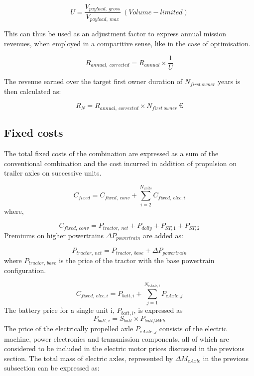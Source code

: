 \documentclass[ExampleMasters.tex]{subfiles}
\begin{document}
		\begin{equation}
			U = \frac{V_{payload,\ gross}}{V_{payload,\ max}}\ (Volume-limited)
		\end{equation}

		This can thus be used as an adjustment factor to express annual mission revenues, when employed in a comparitive sense, like in the case of optimisation.

		\begin{equation}
			R_{annual,\ corrected} = R_{annual} \times \frac{1}{U}
		\end{equation}

		The revenue earned over the target first owner duration of $N_{first\ owner}$ years is then calculated as:

		\begin{equation}
			R_{N} = R_{annual,\ corrected} \times N_{first\ owner} \  \euro
		\end{equation}

		\subsection{Fixed costs}

			The total fixed costs of the combination are expressed as a sum of the conventional combination and the cost incurred in addition of propulsion on trailer axles on successive units.

			\begin{equation}
				C_{fixed} = C_{fixed,\ conv}+ \displaystyle \sum_{i=2}^{N_{units}} C_{fixed,\ elec, i}
			\end{equation}
			where,

			\begin{equation}
				C_{fixed,\ conv} = P_{tractor,\ net}+P_{dolly}+P_{ST,1}+P_{ST,2}
			\end{equation}
			Premiums on higher powertrains $\Delta P_{powertrain}$ are added as:
			
			\begin{equation}
				P_{tractor,\ net} = P_{tractor,\ base} + \Delta P_{powertrain}
			\end{equation}
			where $P_{tractor,\ base}$ is the price of the tractor with the base powertrain configuration. 

			\begin{equation}
				C_{fixed,\ elec, i} = P_{batt,i}+\displaystyle \sum_{j=1}^{N_{eAxle,i}} P_{eAxle,j}
			\end{equation}
			The battery price for a single unit i, $P_{batt,i}$, is expressed as
			\begin{equation}
				P_{batt,i}= S_{batt} \times P_{batt/kWh}
			\end{equation}
			The price of the electrically propelled axle $P_{eAxle,j}$ consists of the electric machine, power electronics and transmission components, all of which are considered to be included in the electric motor prices discussed in the previous section. The total mass of electric axles, represented by $\Delta M_{eAxle}$ in the previous subsection can be expressed as:
\end{document}

